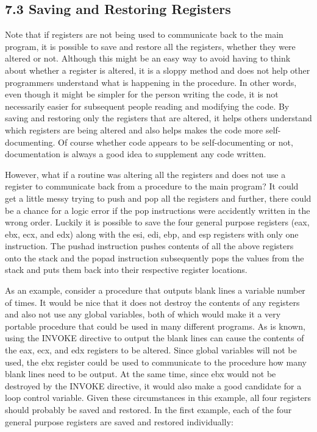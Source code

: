 \documentclass[10pt]{book}
\begin{document}
\begin{center}
\begin{center}
\subsection*{7.3 Saving and Restoring Registers}
Note that if registers are not being used to communicate back to the main program, it is possible to save and restore all the registers, whether they were altered or not. Although this might be an easy way to avoid having to think about whether a register is altered, it is a sloppy method and does not help other programmers understand what is happening in the procedure. In other words, even though it might be simpler for the person writing the code, it is not necessarily easier for subsequent people reading and modifying the code. By saving and restoring only the registers that are altered, it helps others understand which registers are being altered and also helps makes the code more self-documenting. Of course whether code appears to be self-documenting or not, documentation is always a good idea to supplement any code written.

However, what if a routine was altering all the registers and does not use a register to communicate back from a procedure to the main program? It could get a little messy trying to push and pop all the registers and further, there could be a chance for a logic error if the pop instructions were accidently written in the wrong order. Luckily it is possible to save the four general purpose registers (eax, ebx, ecx, and edx) along with the esi, edi, ebp, and esp registers with only one instruction. The pushad instruction pushes contents of all the above registers onto the stack and the popad instruction subsequently pops the values from the stack and puts them back into their respective register locations.

As an example, consider a procedure that outputs blank lines a variable number of times. It would be nice that it does not destroy the contents of any registers and also not use any global variables, both of which would make it a very portable procedure that could be used in many different programs. As is known, using the INVOKE directive to output the blank lines can cause the contents of the eax, ecx, and edx registers to be altered. Since global variables will not be used, the ebx register could be used to communicate to the procedure how many blank lines need to be output. At the same time, since ebx would not be destroyed by the INVOKE directive, it would also make a good candidate for a loop control variable. Given these circumstances in this example, all four registers should probably be saved and restored. In the first example, each of the four general purpose registers are saved and restored individually:



\end{center}
\end{center}
\end{document}
